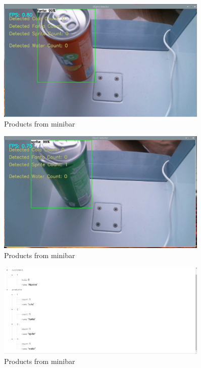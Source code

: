 \begin{figure}[!htbp]
    \centering
    \includegraphics[width=0.9\textwidth]{Imgs/only fanta.PNG}
    \caption{\label{fig:products in minibar}Products from minibar}
\end{figure}

\begin{figure}[!htbp]
    \centering
    \includegraphics[width=0.9\textwidth]{Imgs/only sprite.PNG}
    \caption{\label{fig:products in minibar}Products from minibar}
\end{figure}

\begin{figure}[!htbp]
    \centering
    \includegraphics[width=0.9\textwidth]{Imgs/beforetaking cola.PNG}
    \caption{\label{fig:roducts in minibar}Products from minibar}
\end{figure}

